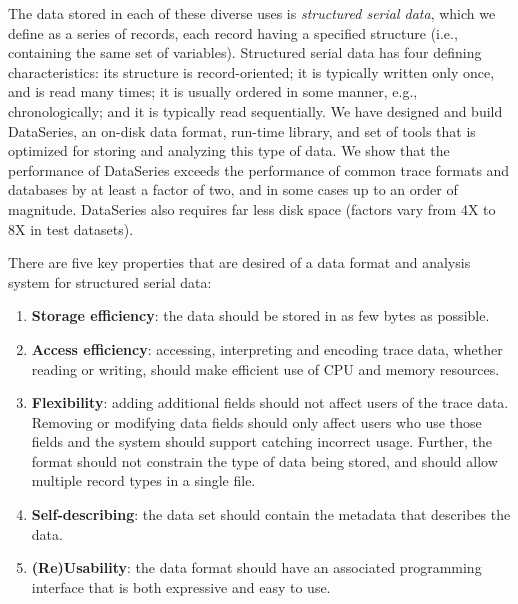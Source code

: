 \documentclass{acm_proc_article-sp}
\begin{document}
The data stored in each of these diverse uses is {\it structured
serial data}, which we define as a series of records, each record
having a specified structure (i.e., containing the same set of
variables). Structured serial data has four defining characteristics:
its structure is record-oriented; it is typically written only once,
and is read many times; it is usually ordered
in some manner, e.g., chronologically; and it is typically read
sequentially.  We have designed and build DataSeries, an on-disk 
data format, run-time library, and set of
tools that is optimized for storing and analyzing this type of data.
We show that the performance of DataSeries
exceeds the performance of common trace formats and databases by at
least a factor of two, and in some cases up to an order of
magnitude. DataSeries also requires far less disk space (factors vary
from 4X to 8X in test datasets).


There are five key properties that are desired of a data format
and analysis system for structured serial data:

\begin{enumerate}

\item \textbf{Storage efficiency}: the data should be stored in as few
bytes as possible.

\item \textbf{Access efficiency}: accessing, interpreting and encoding
trace data, whether reading or writing, should make efficient use of
CPU and memory resources.

\item \textbf{Flexibility}: adding additional fields should not affect
users of the trace data.  Removing or modifying data fields should
only affect users who use those fields and the system should support
catching incorrect usage.  Further, the format should not constrain
the type of data being stored, and should allow multiple record types
in a single file.

\item \textbf{Self-describing}: the data set should contain the
metadata that describes the data.

\item \textbf{(Re)Usability}: the data format should have an associated
programming interface that is both expressive and easy to use.

\end{enumerate}
\end{document}
